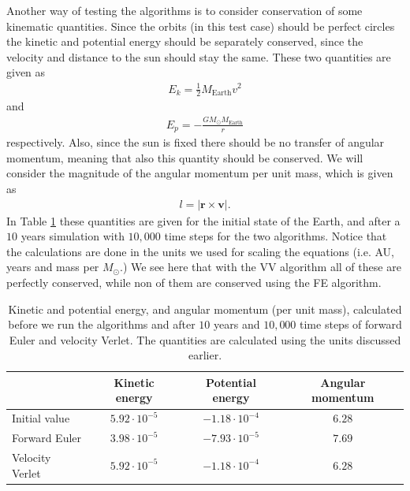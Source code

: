 \documentclass[12pt, a4paper]{article}
\begin{document}
Another way of testing the algorithms is to consider conservation of some kinematic quantities. Since 
the orbits (in this test case) should be perfect circles the kinetic and potential energy should be 
separately conserved, since the velocity and distance to the sun should stay the same.
These two quantities are given as 
\begin{align*}
E_k = \frac{1}{2}M_{\text{Earth}}v^2 
\end{align*}
and 
\begin{align*}
E_p = - \frac{GM_{\odot}M_{\text{Earth}}}{r}
\end{align*}
respectively. Also, since the sun is fixed there should be no transfer of angular momentum, meaning that
also this quantity should be conserved. We will consider the magnitude of the angular momentum per unit 
mass, which is given as 
\begin{align*}
l = | \mathbf{r} \times \mathbf{v} |. 
\end{align*}
In Table \ref{tab:kinematics} these quantities are given for the initial state of the Earth, 
and after a $10$ years simulation with $10,000$ time steps for the two algorithms.
Notice that the calculations are done in the units we used for scaling the equations (i.e. AU, years and 
mass per $M_{\odot}$.) We see here that 
with the VV algorithm all of these are perfectly conserved, while non of them are conserved 
using the FE algorithm.  

\begin{table}[ht!]
\caption{Kinetic and potential energy, and angular momentum (per unit mass), calculated before we 
run the algorithms and after $10$ years and $10,000$ time steps of forward Euler and velocity Verlet. 
The quantities are calculated using the units discussed earlier.}
\label{tab:kinematics}
\begin{center}
\begin{tabular}{lccc}  
		& Kinetic energy & Potential energy & Angular momentum  \\ \hline 
Initial value   & $5.92\cdot10^{-5}$ & $-1.18\cdot10^{-4}$ & $6.28$ \\ 
Forward Euler 	& $3.98\cdot10^{-5}$ & $-7.93\cdot10^{-5}$ & $7.69$ \\ 
Velocity Verlet & $5.92\cdot10^{-5}$ & $-1.18\cdot10^{-4}$ & $6.28$ \\ 	
\end{tabular}
\end{center}
\end{table}
\end{document}
